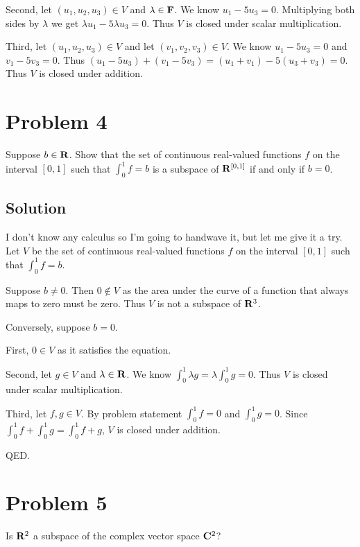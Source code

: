 \documentclass{article}
\begin{document}
\vs

Second, let $(u_1, u_2, u_3)\in V$ and $\lambda\in\mathbf{F}$. We know $u_1-5u_3=0$. Multiplying both sides by $\lambda$ we get $\lambda u_1-5\lambda u_3=0$. Thus $V$ is closed under scalar multiplication.

\vs

Third, let $(u_1, u_2, u_3)\in V$ and let $(v_1, v_2, v_3)\in V$. We know $u_1-5u_3=0$ and $v_1-5v_3=0$. Thus $(u_1-5u_3)+(v_1-5v_3)=(u_1 + v_1)-5(u_3+v_3)=0$. Thus $V$ is closed under addition.

\section*{Problem 4}
Suppose $b\in\mathbf{R}$. Show that the set of continuous real-valued functions $f$ on the interval $[0, 1]$ such that $\int_0^1 f=b$ is a subspace of $\mathbf{R}^{[0,1]}$ if and only if $b=0$.

\subsection*{Solution}

I don't know any calculus so I'm going to handwave it, but let me give it a try. Let $V$ be the set of continuous real-valued functions $f$ on the interval $[0, 1]$ such that $\int_0^1 f=b$.

\vs

Suppose $b\neq 0$. Then $0\notin V$ as the area under the curve of a function that always maps to zero must be zero. Thus $V$ is not a subspace of $\mathbf{R}^3$.

\vs

Conversely, suppose $b=0$.

\vs

First, $0\in V$ as it satisfies the equation.

\vs

Second, let $g\in V$ and $\lambda \in \mathbf{R}$. We know $\int_0^1 \lambda g=\lambda\int_0^1 g=0$. Thus $V$ is closed under scalar multiplication.

\vs

Third, let $f, g\in V$. By problem statement $\int_0^1 f=0$ and $\int_0^1 g=0$. Since $\int_0^1 f + \int_0^1 g=\int_0^1 f+g$, $V$ is closed under addition.

\vs

QED.

\section*{Problem 5}
Is $\mathbf{R}^2$ a subspace of the complex vector space $\mathbf{C}^2$?
\end{document}
